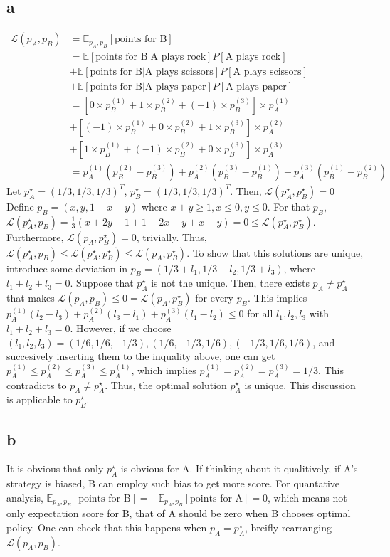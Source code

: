 \documentclass[10pt]{article}
\begin{document}
\subsection*{a}
\begin{align*}
    \mathcal{L}(p_A,p_B) &= \mathbb{E}_{p_A,p_B}[\text{points for B}] \\ &= \mathbb{E}[\text{points for B}|\text{A plays rock}]P[\text{A plays rock}] \\ &+ \mathbb{E}[\text{points for B}|\text{A plays scissors}]P[\text{A plays scissors}] \\ &+ \mathbb{E}[\text{points for B}|\text{A plays paper}]P[\text{A plays paper}] \\
    &= \left[0\times p_B^{(1)} + 1\times p_B^{(2)} + (-1)\times p_B^{(3)}\right]\times p_A^{(1)} \\ &+ \left[(-1)\times p_B^{(1)} + 0\times p_B^{(2)} + 1\times p_B^{(3)}\right]\times p_A^{(2)} \\ &+ \left[1\times p_B^{(1)} + (-1)\times p_B^{(2)} + 0\times p_B^{(3)}\right]\times p_A^{(3)} \\
    &= p_A^{(1)}(p_B^{(2)} - p_B^{(3)}) + p_A^{(2)}(p_B^{(3)} - p_B^{(1)}) + p_A^{(3)}(p_B^{(1)} - p_B^{(2)}) 
\end{align*}
Let $p_A^\star = \left(1/3,1/3,1/3\right)^T$, $p_B^\star = \left(1/3,1/3,1/3\right)^T$. Then, $\mathcal{L}(p_A^\star, p_B^\star) = 0$
Define $p_B = (x, y, 1-x-y)$ where $x+y \ge 1, x\le0,y\le0$. For that $p_B$, $\mathcal{L}(p_A^\star,p_B) = \frac{1}{3}(x+2y-1 + 1-2x-y + x-y) = 0 \le \mathcal{L}(p_A^\star, p_B^\star)$.
Furthermore, $\mathcal{L}(p_A,p_B^\star) = 0$, trivially. Thus, $\mathcal{L}(p_A^\star, p_B) \le \mathcal{L}(p_A^\star, p_B^\star) \le \mathcal{L}(p_A, p_B^\star)$.
To show that this solutions are unique, introduce some deviation in $p_B = \left(1/3+l_1, 1/3+l_2, 1/3 + l_3\right)$, where $l_1 + l_2 + l_3 = 0$.
Suppose that $p_A^\star$ is not the unique. Then, there exists $p_A\neq p_A^\star$ that makes $\mathcal{L}(p_A, p_B) \le 0 = \mathcal{L}(p_A,p_B^\star)$ for every $p_B$.
This implies $p_A^{(1)}(l_2-l_3) + p_A^{(2)}(l_3-l_1) + p_A^{(3)}(l_1-l_2) \le 0$ for all $l_1,l_2,l_3$ with $l_1 + l_2 + l_3 = 0$. However, if we choose $(l_1,l_2,l_3) = (1/6,1/6,-1/3), (1/6,-1/3,1/6),(-1/3,1/6,1/6)$, and succesively inserting them to the inquality above, one can get
$p_A^{(1)} \le p_A^{(2)} \le p_A^{(3)} \le p_A^{(1)}$, which implies $p_A^{(1)} = p_A^{(2)} = p_A^{(3)} = 1/3$. This contradicts to $p_A \neq p_A^\star$. Thus, the optimal solution $p_A^\star$ is unique.
This discussion is applicable to $p_B^\star$.
\subsection*{b}
It is obvious that only $p_A^\star$ is obvious for A. If thinking about it qualitively, if A's strategy is biased, B can employ such bias to get more score. 
For quantative analysis, $\mathbb{E}_{p_A,p_B}[\text{points for B}] = - \mathbb{E}_{p_A,p_B}[\text{points for A}] = 0$, which means not only expectation score for B, that of A should be zero when B chooses optimal policy.
One can check that this happens when $p_A = p_A^\star$, breifly rearranging $\mathcal{L}(p_A,p_B)$.
\end{document}
